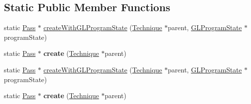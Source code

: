 \subsection*{Static Public Member Functions}
\begin{DoxyCompactItemize}
\item 
static \hyperlink{classPass}{Pass} $\ast$ \hyperlink{classPass_a10060f69cfee6a75d115bd4e146fe419}{create\+With\+G\+L\+Program\+State} (\hyperlink{classTechnique}{Technique} $\ast$parent, \hyperlink{classGLProgramState}{G\+L\+Program\+State} $\ast$program\+State)
\item 
\mbox{\label{classPass_a9729c800c1c7ea07554edcf7fd4ead2c}} 
static \hyperlink{classPass}{Pass} $\ast$ {\bfseries create} (\hyperlink{classTechnique}{Technique} $\ast$parent)
\item 
static \hyperlink{classPass}{Pass} $\ast$ \hyperlink{classPass_afaf117f6a07475c832d3fb9c036d2caf}{create\+With\+G\+L\+Program\+State} (\hyperlink{classTechnique}{Technique} $\ast$parent, \hyperlink{classGLProgramState}{G\+L\+Program\+State} $\ast$program\+State)
\item 
\mbox{\label{classPass_a15d7519392a60b6b4b6f6751577c5233}} 
static \hyperlink{classPass}{Pass} $\ast$ {\bfseries create} (\hyperlink{classTechnique}{Technique} $\ast$parent)
\end{DoxyCompactItemize}
